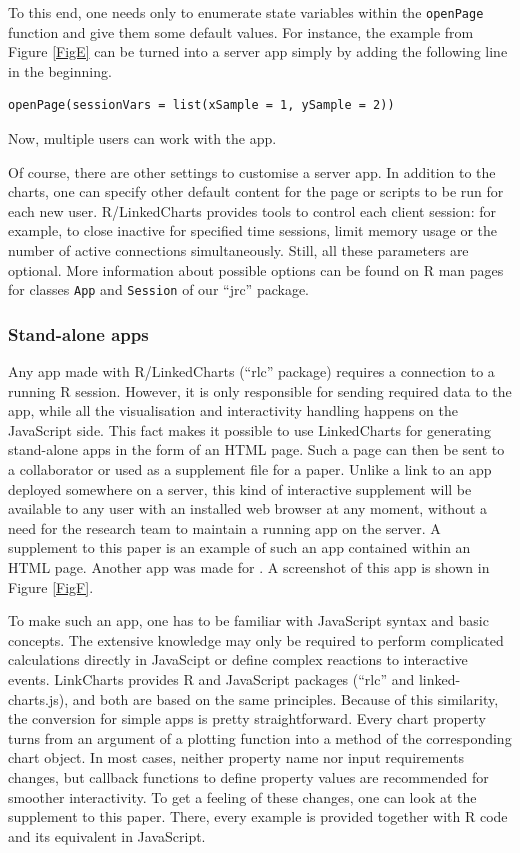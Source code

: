\documentclass[twocolumn,10pt]{article}
\begin{document}
To this end, one needs only to enumerate state variables within the \texttt{openPage} function and give them some default values. For instance, the example from Figure \ref{FigE} can be turned into a server app simply by adding the following line in the beginning.

\begin{verbatim}
openPage(sessionVars = list(xSample = 1, ySample = 2))
\end{verbatim}

Now, multiple users can work with the app.

Of course, there are other settings to customise a server app. In addition to the charts, one can specify other default content for the page or scripts to be run for each new user. R/LinkedCharts provides tools to control each client session: for example, to close inactive for specified time sessions, limit memory usage or the number of active connections simultaneously. Still, all these parameters are optional. More information about possible options can be found on R man pages for classes \texttt{App} and \texttt{Session} of our ``jrc'' package.

\subsubsection{Stand-alone apps}

Any app made with R/LinkedCharts (``rlc'' package) requires a connection to a running R session. However, it is only responsible for sending required data to the app, while all the visualisation and interactivity handling happens on the JavaScript side. This fact makes it possible to use LinkedCharts for generating stand-alone apps in the form of an HTML page. Such a page can then be sent to a collaborator or used as a supplement file for a paper. Unlike a link to an app deployed somewhere on a server, this kind of interactive supplement will be available to any user with an installed web browser at any moment, without a need for the research team to maintain a running app on the server. A supplement to this paper is an example of such an app contained within an HTML page. Another app was made for \citet{wang_2020}. A screenshot of this app is shown in Figure \ref{FigF}.

To make such an app, one has to be familiar with JavaScript syntax and basic concepts. The extensive knowledge may only be required to perform complicated calculations directly in JavaScipt or define complex reactions to interactive events. LinkCharts provides R and JavaScript packages (``rlc'' and linked-charts.js), and both are based on the same principles. Because of this similarity, the conversion for simple apps is pretty straightforward. Every chart property turns from an argument of a plotting function into a method of the corresponding chart object. In most cases, neither property name nor input requirements changes, but callback functions to define property values are recommended for smoother interactivity. To get a feeling of these changes, one can look at the supplement to this paper. There, every example is provided together with R code and its equivalent in JavaScript.
\end{document}
